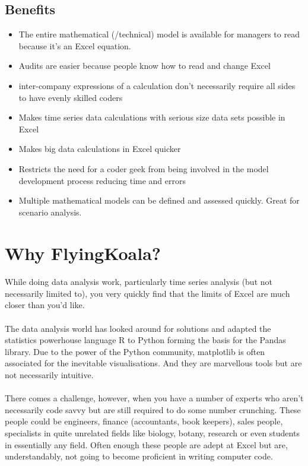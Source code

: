 \documentclass[12pt,a4paper,twoside,openright,titlepage]{article}
\begin{document}
\subsection{Benefits}
\begin{itemize}
	\item The entire mathematical (/technical) model is available for managers to read because it's an Excel equation.
	\item Audits are easier because people know how to read and change Excel
	\item inter-company expressions of a calculation don't necessarily require all sides to have evenly skilled coders
	\item Makes time series data calculations with serious size data sets possible in Excel
	\item Makes big data calculations in Excel quicker
	\item Restricts the need for a coder geek from being involved in the model development process reducing time and errors
	\item Multiple mathematical models can be defined and assessed quickly. Great for scenario analysis.
\end{itemize}

\newpage
\section{Why FlyingKoala?}

\paragraph{} While doing data analysis work, particularly time series analysis (but not necessarily limited to), you very quickly find that the limits of Excel are much closer than you'd like.

\paragraph{} The data analysis world has looked around for solutions and adapted the statistics powerhouse language R to Python forming the basis for the Pandas library. Due to the power of the Python community, matplotlib is often associated for the inevitable visualisations. And they are marvellous tools but are not necessarily intuitive.

\paragraph{} There comes a challenge, however, when you have a number of experts who aren't necessarily code savvy but are still required to do some number crunching. These people could be engineers, finance (accountants, book keepers), sales people, specialists in quite unrelated fields like biology, botany, research or even students in essentially any field. Often enough these people are adept at Excel but are, understandably, not going to become proficient in writing computer code.
\end{document}
